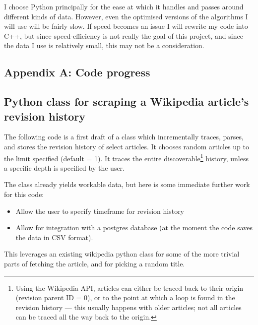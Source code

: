 \documentclass[a4paper,11pt,twoside,notitlepage]{article}
\begin{document}
        I choose Python principally for the ease at which it handles
        and passes around different kinds of data. However, even the
        optimised versions of the algorithms I will use will be fairly
        slow. If speed becomes an issue I will rewrite my code into
        C++, but since speed-efficiency is not really the goal of this
        project, and since the data I use is relatively small, this
        may not be a consideration.

        \clearpage
        \printbibliography        

        \clearpage
        \begin{appendices}
          \section{Appendix A: Code progress}
          \subsection{Python class for scraping a Wikipedia article's
            revision history}
          \label{wiki-scrape}
          The following code is a first draft of a class which incrementally
          traces, parses, and stores the revision history of select articles. It
          chooses random articles up to the limit specified (default =
          1). It traces the entire discoverable\footnote{Using the
            Wikipedia API, articles can either be traced back to their
            origin (revision parent ID = 0), or to the point at which
            a loop is found in the revision history --- this usually
            happens with older articles; not all articles can be
            traced all the way back to the origin.} history, unless a
          specific depth is specified by the user.
          
          The class already yields workable data, but here is some immediate
          further work for this code:
          \begin{itemize}
          \item Allow the user to specify timeframe for revision history
          \item Allow for integration with a postgres database (at the moment
            the code saves the data in CSV format).
          \end{itemize}
          
          This leverages an existing wikipedia python class for some
          of the more trivial parts of fetching the article, and for
          picking a random title.\cite{python-wikipedia} 
          

\end{appendices}
\end{document}
